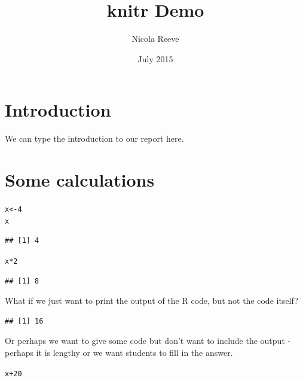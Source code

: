 \documentclass{article}\usepackage[]{graphicx}\usepackage[]{color}
\title{knitr Demo}    %
\author{Nicola Reeve}
\date{July 2015}
\makeatletter
\newcommand{\hlnum}[1]{\textcolor[rgb]{0.686,0.059,0.569}{#1}}%
\newcommand{\hlopt}[1]{\textcolor[rgb]{0,0,0}{#1}}%
\newcommand{\hlstd}[1]{\textcolor[rgb]{0.345,0.345,0.345}{#1}}%
\newcommand{\hlkwb}[1]{\textcolor[rgb]{0.69,0.353,0.396}{#1}}%
\newenvironment{kframe}{%
 \def\at@end@of@kframe{}%
 \ifinner\ifhmode%
  \def\at@end@of@kframe{\end{minipage}}%
  \begin{minipage}{\columnwidth}%
 \fi\fi%
 \def\FrameCommand##1{\hskip\@totalleftmargin \hskip-\fboxsep
 \colorbox{shadecolor}{##1}\hskip-\fboxsep
     \hskip-\linewidth \hskip-\@totalleftmargin \hskip\columnwidth}%
 \MakeFramed {\advance\hsize-\width
   \@totalleftmargin\z@ \linewidth\hsize
   \@setminipage}}%
 {\par\unskip\endMakeFramed%
 \at@end@of@kframe}
\newenvironment{knitrout}{}{} %
\makeatother
\begin{document}
\maketitle      %


\section{Introduction}
We can type the introduction to our report here.

\section{Some calculations}

\begin{knitrout}
\color{fgcolor}\begin{kframe}
\begin{alltt}
\hlstd{x}\hlkwb{<-}\hlnum{4}
\hlstd{x}
\end{alltt}
\begin{verbatim}
## [1] 4
\end{verbatim}
\begin{alltt}
\hlstd{x}\hlopt{*}\hlnum{2}
\end{alltt}
\begin{verbatim}
## [1] 8
\end{verbatim}
\end{kframe}
\end{knitrout}

What if we just want to print the output of the R code, but not the code itself?
\begin{knitrout}
\color{fgcolor}\begin{kframe}
\begin{verbatim}
## [1] 16
\end{verbatim}
\end{kframe}
\end{knitrout}

Or perhaps we want to give some code but don't want to include the output - perhaps it is lengthy or we want students to fill in the answer.

\begin{knitrout}
\color{fgcolor}\begin{kframe}
\begin{alltt}
\hlstd{x}\hlopt{+}\hlnum{20}
\end{alltt}
\end{kframe}
\end{knitrout}
\end{document}

